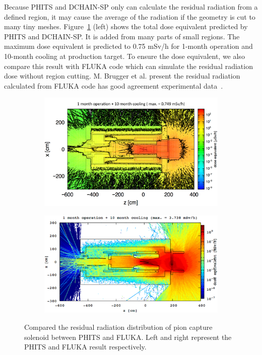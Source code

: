 Because PHITS and DCHAIN-SP only can calculate the residual radiation from a defined region, it may cause the average of the radiation if the geometry is cut to many tiny meshes.
Figure~\ref{2dose2} (left) shows the total dose equivalent predicted by PHITS and DCHAIN-SP.
It is added from many parts of small regions.
The maximum dose equivalent is predicted to 0.75 mSv/h for 1-month operation and 10-month cooling at production target.
To ensure the dose equivalent, we also compare this result with FLUKA code which can simulate the residual radiation dose without region cutting.
M. Brugger et al. present the residual radiation calculated from FLUKA code has good agreement experimental data~\cite{brugger}.
 \begin{figure}[H]
  \begin{subfigure}{0.3\textwidth}
   \centering
   \includegraphics[scale=0.33]{chapter3/fig/phitsdose.pdf}
  \end{subfigure}
  \hspace{0.2\textwidth}
  \begin{subfigure}{0.3\textwidth}
   \centering
   \includegraphics[scale=0.33]{chapter3/fig/flukadose.pdf}
  \end{subfigure}
  \caption{Compared the residual radiation distribution of pion capture solenoid between PHITS and FLUKA. Left and right represent the PHITS and FLUKA result respectively.}
  \label{2dose2}
 \end{figure}
